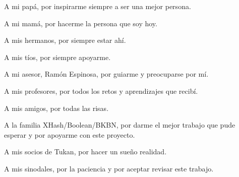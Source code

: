 \documentclass[11pt, oneside]{book}
\begin{document}
A mi papá, por inspirarme siempre a ser una mejor persona.

A mi mamá, por hacerme la persona que soy hoy.

A mis hermanos, por siempre estar ahí.

A mis tíos, por siempre apoyarme. 

A mi asesor, Ramón Espinosa, por guiarme y preocuparse por mí. 

A mis profesores, por todos los retos y aprendizajes que recibí.

A mis amigos, por todas las risas. 


A la familia XHash/Boolean/BKBN, por darme el mejor trabajo que pude esperar y por apoyarme con este proyecto. 

A mis socios de Tukan, por hacer un sueño realidad.

A mis sinodales, por la paciencia y por aceptar revisar este trabajo.  
\end{document}

